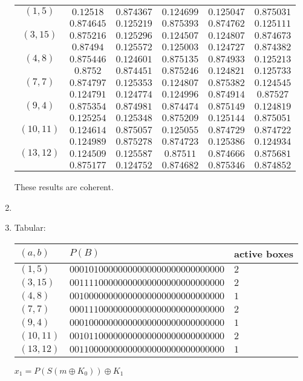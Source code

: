 \begin{enumerate}[label=\textbf{\arabic*})]
    \begin{tabular}{|c|ccccc|}
        \hline
        $(1, 5)$ & $0.12518$ & $0.874367$ & $0.124699$ & $0.125047$ & $0.875031$\\
            & $0.874645$ & $0.125219$ & $0.875393$ & $0.874762$ & $0.125111$\\
        \hline
        $(3, 15)$ & $0.875216$ & $0.125296$ & $0.124507$ & $0.124807$ & $0.874673$\\
            & $0.87494$ & $0.125572$ & $0.125003$ & $0.124727$ & $0.874382$\\
        \hline
        $(4, 8)$ & $0.875446$ & $0.124601$ & $0.875135$ & $0.874933$ & $0.125213$\\
            & $0.8752$ & $0.874451$ & $0.875246$ & $0.124821$ & $0.125733$\\
            \hline
        $(7, 7)$ & $0.874797$ & $0.125353$ & $0.124807$ & $0.875382$ & $0.124545$\\
            & $0.124791$ & $0.124774$ & $0.124996$ & $0.874914$ & $0.87527$\\
            \hline
        $(9, 4)$ & $0.875354$ & $0.874981$ & $0.874474$ & $0.875149$ & $0.124819$\\
            & $0.125254$ & $0.125348$ & $0.875209$ & $0.125144$ & $0.875051$\\
            \hline
        $(10, 11)$ & $0.124614$ & $0.875057$ & $0.125055$ & $0.874729$ & $0.874722$\\
            & $0.124989$ & $0.875278$ & $0.874723$ & $0.125386$ & $0.124934$\\
            \hline
        $(13, 12)$ & $0.124509$ & $0.125587$ & $0.87511$ & $0.874666$ & $0.875681$\\
            & $0.875177$ & $0.124752$ & $0.874682$ & $0.875346$ & $0.874852$\\
        \hline
    \end{tabular}

    These results are coherent.

    \item {}

    \item Tabular:

    \begin{tabular}{lll}
        $(a, b)$ & $P(B)$ & active boxes \\
        \hline
        $(1, 5)$    & $00010100000000000000000000000000$ & $2$\\
        $(3, 15)$   & $00111100000000000000000000000000$ & $2$\\
        $(4, 8)$    & $00100000000000000000000000000000$ & $1$\\
        $(7, 7)$    & $00011100000000000000000000000000$ & $2$\\
        $(9, 4)$    & $00010000000000000000000000000000$ & $1$\\
        $(10, 11)$  & $00101100000000000000000000000000$ & $2$\\
        $(13, 12)$  & $00110000000000000000000000000000$ & $1$\\
    \end{tabular}

    $x_1 = P(S(m \oplus K_0))\oplus K_1$
\end{enumerate}


